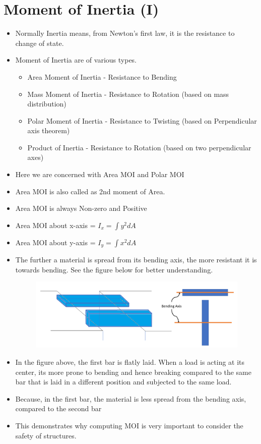 \documentclass[8pt]{report}
\begin{document}
	\section{Moment of Inertia (I)}
		\begin{itemize}
			\item Normally Inertia means, from Newton's first law, it is the resistance to change  of state.
			\item Moment of Inertia are of various types.
				\begin{itemize}
					\item Area Moment of Inertia -  Resistance to Bending
					\item Mass Moment of Inertia - Resistance to Rotation (based on mass distribution)
					\item Polar Moment of Inertia - Resistance to Twisting (based on Perpendicular axis theorem)
					\item Product of Inertia - Resistance to Rotation (based on two perpendicular axes)
				\end{itemize}
			\item Here we are concerned with Area MOI and Polar MOI
			\item Area MOI is also called as 2nd moment of Area. 
			\item Area MOI is always Non-zero and Positive
			\item Area MOI about x-axis = $\boxed{I_{x} = \int y^2dA}$
			\item Area MOI about y-axis = $\boxed{I_{y} = \int x^2dA}$
			\item The further a material is spread from its bending axis, the more resistant it is towards bending. See the figure below for better understanding.
			\begin{figure}[H]
				\centering
				\includegraphics[scale=0.4]{bending.png}
			\end{figure}
			\item In the figure above, the first bar is flatly laid. When a load is acting at its center, its more prone to bending and hence breaking compared to the same bar that is laid in a different position and subjected to the same load. 
			\item Because, in the first bar, the material is less spread from the bending axis, compared to the second bar
			\item This demonstrates why computing MOI is very important to consider the safety of structures. 
		\end{itemize}\hrulefill
\end{document}
